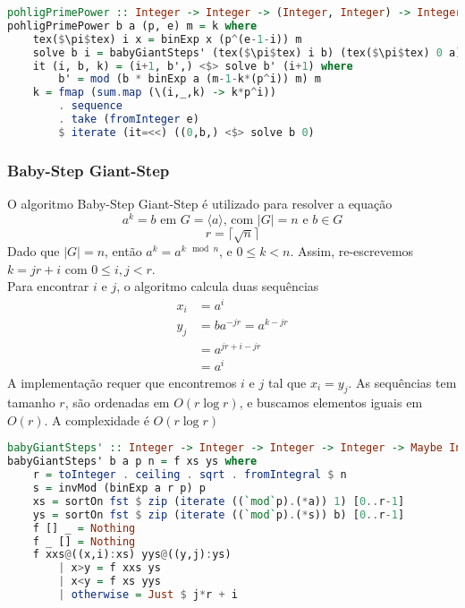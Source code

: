 \documentclass{article}
\begin{document}
\noindent\hspace{0.03\linewidth}
\begin{minipage}{.9\linewidth}
\begin{lstlisting}[language=haskell,caption=Pohlig Prime Power]
pohligPrimePower :: Integer -> Integer -> (Integer, Integer) -> Integer -> Maybe Integer
pohligPrimePower b a (p, e) m = k where
    tex($\pi$tex) i x = binExp x (p^(e-1-i)) m
    solve b i = babyGiantSteps' (tex($\pi$tex) i b) (tex($\pi$tex) 0 a) m p
    it (i, b, k) = (i+1, b',) <$> solve b' (i+1) where
        b' = mod (b * binExp a (m-1-k*(p^i)) m) m
    k = fmap (sum.map (\(i,_,k) -> k*p^i))
        . sequence
        . take (fromInteger e)
        $ iterate (it=<<) ((0,b,) <$> solve b 0)
\end{lstlisting}
\end{minipage}

\subsubsection{Baby-Step Giant-Step}
O algoritmo Baby-Step Giant-Step é utilizado para resolver a equação
$$ a^k = b \text{ em } G = \langle a \rangle\text{, com }|G| = n\text{ e }b \in G$$
$$ r = \lceil \sqrt{n} \rceil $$
Dado que $ |G| = n $, então $ a^k = a^{k \mod n} $, e $ 0 \leq k < n $. Assim, re-escrevemos $ k = j r + i $ com $ 0 \leq i, j < r $.\\
Para encontrar $i$ e $j$, o algoritmo calcula duas sequências
\begin{align*}
    x_i &= a^i\\
    y_j &= b a^{-j r} = a^{k - j r}\\
        &= a^{j r + i - j r}\\
        &= a^{i}
\end{align*}
A implementação requer que encontremos $i$ e $j$ tal que $x_i = y_j$. As sequências tem tamanho $r$, são ordenadas em $O(r \log r)$, e buscamos elementos iguais em $O(r)$. A complexidade é $O(r \log r)$

\noindent\hspace{0.03\linewidth}
\begin{minipage}{.9\linewidth}
\begin{lstlisting}[language=haskell,caption=Baby-Steps Giant-Steps]
babyGiantSteps' :: Integer -> Integer -> Integer -> Integer -> Maybe Integer
babyGiantSteps' b a p n = f xs ys where
    r = toInteger . ceiling . sqrt . fromIntegral $ n
    s = invMod (binExp a r p) p
    xs = sortOn fst $ zip (iterate ((`mod`p).(*a)) 1) [0..r-1]
    ys = sortOn fst $ zip (iterate ((`mod`p).(*s)) b) [0..r-1]
    f [] _ = Nothing
    f _ [] = Nothing
    f xxs@((x,i):xs) yys@((y,j):ys)
        | x>y = f xxs ys
        | x<y = f xs yys
        | otherwise = Just $ j*r + i
\end{lstlisting}
\end{minipage}
\end{document}
